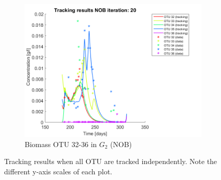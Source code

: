 \documentclass[3p,times]{article}
\begin{document}
\begin{figure}[h]
\begin{subfigure}{0.45 \textwidth}
	\includegraphics[width =\textwidth]{Application//200407_iter_20_NOB_plot_1}
	\caption{Biomass OTU 32-36 in $G_2$ (NOB) }
	\end{subfigure}
	\caption{Tracking results when all OTU are tracked independently. Note the different y-axis scales of each plot.}
	\label{OTU abudance all}
\end{figure}
\end{document}
